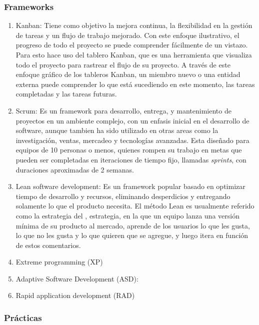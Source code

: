     \subsubsection{Frameworks}

    \begin{enumerate}
        \item Kanban: Tiene como objetivo la mejora continua, la flexibilidad en la gestión de tareas y un flujo de trabajo mejorado. Con este enfoque ilustrativo, el progreso de todo el proyecto se puede comprender fácilmente de un vistazo. Para esto hace uso del tablero Kanban, que es una herramienta que visualiza todo el proyecto para rastrear el flujo de su proyecto. A través de este enfoque gráfico de los tableros Kanban, un miembro nuevo o una entidad externa puede comprender lo que está sucediendo en este momento, las tareas completadas y las tareas futuras.
        \item Scrum: Es un framework para desarrollo, entrega, y mantenimiento de proyectos en un ambiente complejo, con un enfasis inicial en el desarrollo de software, aunque tambien ha sido utilizado en otras areas como la investigación, ventas, mercadeo y tecnologías avanzadas. Esta diseñado para equipos de 10 personas o menos, quienes rompen su trabajo en metas que pueden ser completadas en iteraciones de tiempo fijo, llamadas \emph{sprints}, con duraciones aproximadas de 2 semanas. 
        \item Lean software development: Es un framework popular basado en optimizar tiempo de desarrollo y recursos, eliminando desperdicios y entregando solamente lo que el producto necesita. El método Lean es usualmente referido como la estrategia del , 
        estrategia, en la que un equipo lanza una versión mínima de su producto al mercado, aprende de los usuarios lo que les gusta, lo que no les gusta y lo que quieren que se agregue, y luego itera en función de estos comentarios.
        \item Extreme programming (XP)
        \item Adaptive Software Development (ASD):
        \item Rapid application development (RAD)
    \end{enumerate}

    \subsubsection{Prácticas}

